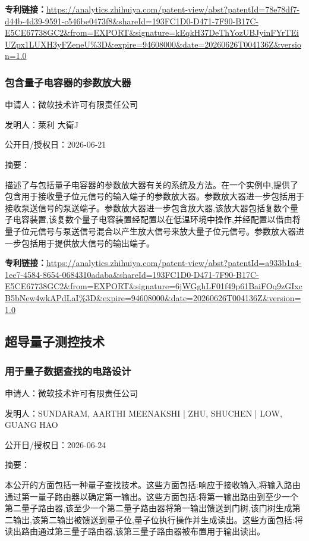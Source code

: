 \documentclass[12pt,a4paper]{ctexart}
\begin{document}
\noindent\textbf{专利链接：}\url{https://analytics.zhihuiya.com/patent-view/abst?patentId=78e78df7-d44b-4d39-9591-c546be0473f8&shareId=193FC1D0-D471-7F90-B17C-E5CE67738GC2&from=EXPORT&signature=kEqkH37DeThYozUBJyinFYrTEiUZpx1LUXH3yFZeneU%3D&expire=94608000&date=20260626T004136Z&version=1.0}

\subsubsection{ 包含量子电容器的参数放大器 }

申请人：微软技术许可有限责任公司

发明人：萊利 大衛J

公开日/授权日：2026-06-21

摘要：

描述了与包括量子电容器的参数放大器有关的系统及方法。在一个实例中,提供了包含用于接收量子位元信号的输入端子的参数放大器。参数放大器进一步包括用于接收泵送信号的泵送端子。参数放大器进一步包含放大器,该放大器包括复数个量子电容装置,该复数个量子电容装置经配置以在低温环境中操作,并经配置以借由将量子位元信号与泵送信号混合以产生放大信号来放大量子位元信号。参数放大器进一步包括用于提供放大信号的输出端子。

\noindent\textbf{专利链接：}\url{https://analytics.zhihuiya.com/patent-view/abst?patentId=a933b1a4-1ee7-4584-8654-0684310adaba&shareId=193FC1D0-D471-7F90-B17C-E5CE67738GC2&from=EXPORT&signature=6jWGghLF01f49p61BaiFOq9zGIxcB5bNew4wkAPdLaI%3D&expire=94608000&date=20260626T004136Z&version=1.0}


\subsection{ 超导量子测控技术 }

\subsubsection{ 用于量子数据查找的电路设计 }

申请人：微软技术许可有限责任公司

发明人：SUNDARAM, AARTHI MEENAKSHI | ZHU, SHUCHEN | LOW, GUANG HAO

公开日/授权日：2026-06-24

摘要：

本公开的方面包括一种量子查找技术。这些方面包括:响应于接收输入,将输入路由通过第一量子路由器以确定第一输出。这些方面包括:将第一输出路由到至少一个第二量子路由器,该至少一个第二量子路由器将第一输出馈送到门树,该门树生成第二输出,该第二输出被馈送到量子位,量子位执行操作并生成读出。这些方面包括:将读出路由通过第三量子路由器,该第三量子路由器被布置用于输出读出。
\end{document}
